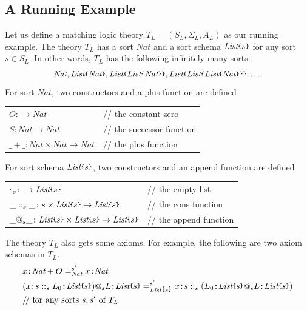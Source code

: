 \documentclass[UTF8,11pt]{article}
\theoremstyle{plain}
\theoremstyle{definition}
\theoremstyle{remark}
\newcommand{\cln}{\texttt{:}}
\newcommand{\Nat}{\textit{Nat}}
\newcommand{\List}{\textit{List}}
\newcommand{\parametric}[2]{{#1}\raisebox{.2ex}{\texttt{\footnotesize{\{}}}#2\raisebox{.2ex}{\texttt{\footnotesize{\}}}}}
\newcommand{\doubleslash}{/\!/{ }}
\begin{document}
\subsection{A Running Example}
Let us define a matching logic theory $T_L = (S_L, \Sigma_L, A_L)$ as our 
running example.
The theory $T_L$ has a sort $\Nat$ and a sort schema $\parametric{\List}{s}$ 
for any sort $s \in S_L$.
In other words, $T_L$ has the following infinitely many sorts:
$$\Nat, \parametric{\List}{\Nat},  
\parametric{\List}{\parametric{\List}{\Nat}}, 
\parametric{\List}{\parametric{\List}{\parametric{\List}{\Nat}}} ,\dots $$
For sort $\Nat$, two constructors and a plus function are defined
\begin{center}
\begin{tabular}{ll}
  $O \colon \to \Nat$       & \doubleslash the constant zero \\
  $S \colon \Nat \to \Nat$  & \doubleslash the successor function \\
  $\_+\_ \colon \Nat \times \Nat \to \Nat$ & \doubleslash the plus function
\end{tabular}
\end{center}
For sort schema $\parametric{\List}{s}$, two constructors and an append
function are defined 
\begin{center}
	\begin{tabular}{ll}
		$\epsilon_s \colon \to \parametric{\List}{s}$       & 
		\doubleslash the empty list \\
		$\_::_s\_ \colon s \times \parametric{\List}{s} \to 
		\parametric{\List}{s}$  & 
		\doubleslash the cons function \\
		$\_@_s\_ \colon \parametric{\List}{s} \times \parametric{\List}{s} \to 
		\parametric{\List}{s}$ & \doubleslash the append function
	\end{tabular}
\end{center}
The theory $T_L$ also gets some axioms.
For example, the following are two axiom schemas in $T_L$.
\begin{align*}
& x \cln \Nat + O =_{\Nat}^{s'} x \cln \Nat \\
& (x \cln s ::_s L_0 \cln \parametric{\List}{s}) @_s L \cln 
\parametric{\List}{s}
=_{\parametric{\List}{s}}^{s'} x \cln s::_s (L_0 \cln 
\parametric{\List}{s}@_s L\cln \parametric{\List}{s}) \\
& \text{\doubleslash for any sorts $s, s'$ of $T_L$}
\end{align*}
\end{document}
